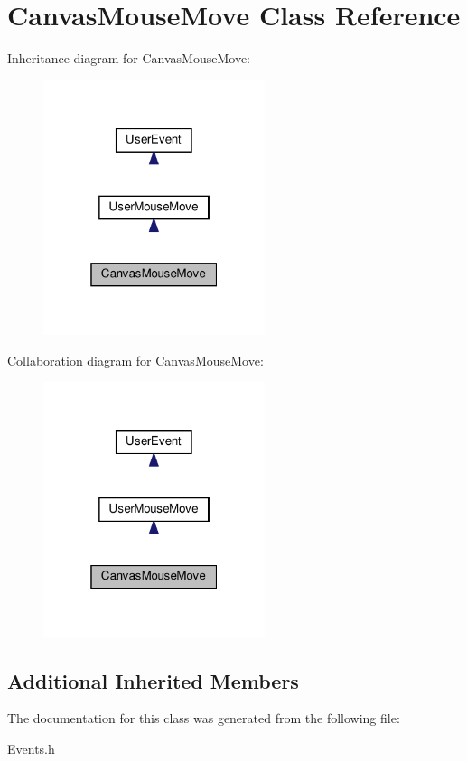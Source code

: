 \hypertarget{classCanvasMouseMove}{}\section{Canvas\+Mouse\+Move Class Reference}
\label{classCanvasMouseMove}


Inheritance diagram for Canvas\+Mouse\+Move\+:\nopagebreak
\begin{figure}[H]
\begin{center}
\leavevmode
\includegraphics[width=184pt]{classCanvasMouseMove__inherit__graph}
\end{center}
\end{figure}


Collaboration diagram for Canvas\+Mouse\+Move\+:\nopagebreak
\begin{figure}[H]
\begin{center}
\leavevmode
\includegraphics[width=184pt]{classCanvasMouseMove__coll__graph}
\end{center}
\end{figure}
\subsection*{Additional Inherited Members}


The documentation for this class was generated from the following file\+:\begin{DoxyCompactItemize}
\item 
Events.\+h\end{DoxyCompactItemize}
